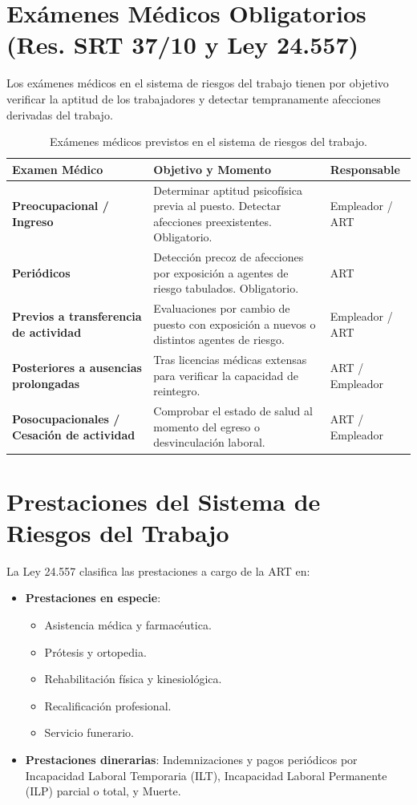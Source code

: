 \documentclass[]{informeutn}
\begin{document}
\section{Exámenes Médicos Obligatorios (Res. SRT 37/10 y Ley 24.557)}
Los exámenes médicos en el sistema de riesgos del trabajo tienen por objetivo verificar la aptitud de los trabajadores y detectar tempranamente afecciones derivadas del trabajo.

\begin{table}[H]
\centering
\begin{tabular}{|p{4.5cm}|p{6.5cm}|p{3.5cm}|}
\hline
\rowcolor{blue!15}\textbf{Examen Médico} & \textbf{Objetivo y Momento} & \textbf{Responsable} \\ \hline
\textbf{Preocupacional / Ingreso} & Determinar aptitud psicofísica previa al puesto. Detectar afecciones preexistentes. Obligatorio. & Empleador / ART \\ \hline
\textbf{Periódicos} & Detección precoz de afecciones por exposición a agentes de riesgo tabulados. Obligatorio. & ART \\ \hline
\textbf{Previos a transferencia de actividad} & Evaluaciones por cambio de puesto con exposición a nuevos o distintos agentes de riesgo. & Empleador / ART \\ \hline
\textbf{Posteriores a ausencias prolongadas} & Tras licencias médicas extensas para verificar la capacidad de reintegro. & ART / Empleador \\ \hline
\textbf{Posocupacionales / Cesación de actividad} & Comprobar el estado de salud al momento del egreso o desvinculación laboral. & ART / Empleador \\ \hline
\end{tabular}
\caption{Exámenes médicos previstos en el sistema de riesgos del trabajo.}
\end{table}

\section{Prestaciones del Sistema de Riesgos del Trabajo}
La Ley 24.557 clasifica las prestaciones a cargo de la ART en:
\begin{itemize}
    \item \textbf{Prestaciones en especie}: 
    \begin{itemize}
        \item Asistencia médica y farmacéutica.
        \item Prótesis y ortopedia.
        \item Rehabilitación física y kinesiológica.
        \item Recalificación profesional.
        \item Servicio funerario.
    \end{itemize}
    \item \textbf{Prestaciones dinerarias}: Indemnizaciones y pagos periódicos por Incapacidad Laboral Temporaria (ILT), Incapacidad Laboral Permanente (ILP) parcial o total, y Muerte.
\end{itemize}
\end{document}
